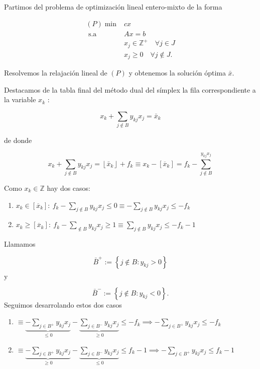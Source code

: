 \documentclass[openany]{book}
\begin{document}
Partimos del problema de optimización lineal entero-mixto de la forma

$$
\begin{aligned}
(P) \min & c x \\
\text { s.a } & A x=b \\
& x_{j} \in \mathbb{Z}^{+} \quad \forall j \in J \\
& x_{j} \geq 0 \quad \forall j \notin J .
\end{aligned}
$$

Resolvemos la relajación lineal de $(P)$ y obtenemos la solución óptima $\bar{x}$.

Destacamos de la tabla final del método dual del símplex la fila correspondiente a la variable $x_{k}$ :

$$
x_{k}+\sum_{j \notin B} y_{k j} x_{j}=\bar{x}_{k}
$$

de donde

$$
x_{k}+\sum_{j \notin B} y_{k j} x_{j}=\left\lfloor\bar{x}_{k}\right\rfloor+f_{k} \equiv x_{k}-[\overline{x}_{k}] = f_{k}- \sum\limits_{j \notin B}^{y_{kj}x_j}
$$

Como $ x_{k} \in \mathbb{Z}$ hay dos casos:

\begin{enumerate}
  \item $ x_{k} \in [\overline{x}_{k}] :\ f_{k} - \sum\limits_{j  \not \in B}y_{kj}x_{j} \leq 0 \equiv - \sum\limits_{j \notin B}^{}y_{kj}x_j \leq -f_{k}$
  \item $ x_{k} \geq [\overline{x}_{k}]:\ f_{k} - \sum\limits_{\not \in B}^{} y_{kj} x_j \geq 1 \equiv \sum\limits_{j \not \in B}^{}y_{kj}x_j \leq -f_{k}-1 $
\end{enumerate}


Llamamos

$$
\bar{B}^{+}:=\left\{j \notin B: y_{k j}>0\right\}
$$

$\mathrm{y}$

$$
\bar{B}^{-}:=\left\{j \notin B: y_{k j}<0\right\} .
$$
Seguimos desarrolando estos dos casos
\begin{enumerate}
  \item $ \equiv \underbrace{-\sum\limits_{j \in B ^{+}}^{} y_{kj} x_j}_{\leq 0} -\underbrace{ \sum\limits_{j \in B^{-}}^{} y_{kj}x_j}_{\geq 0} \leq -f_{k} \implies - \sum\limits_{j \in B^{+}}y_{kj}x_j \leq -f_{k}$
  \item $ \equiv \underbrace{-\sum\limits_{j \in B ^{+}}^{} y_{kj} x_j}_{\geq 0} -\underbrace{ \sum\limits_{j \in B^{-}}^{} y_{kj}x_j}_{\leq 0} \leq f_{k} -1 \implies - \sum\limits_{j \in B^{+}}y_{kj}x_j \leq f_{k}-1$

\end{enumerate}
\end{document}
